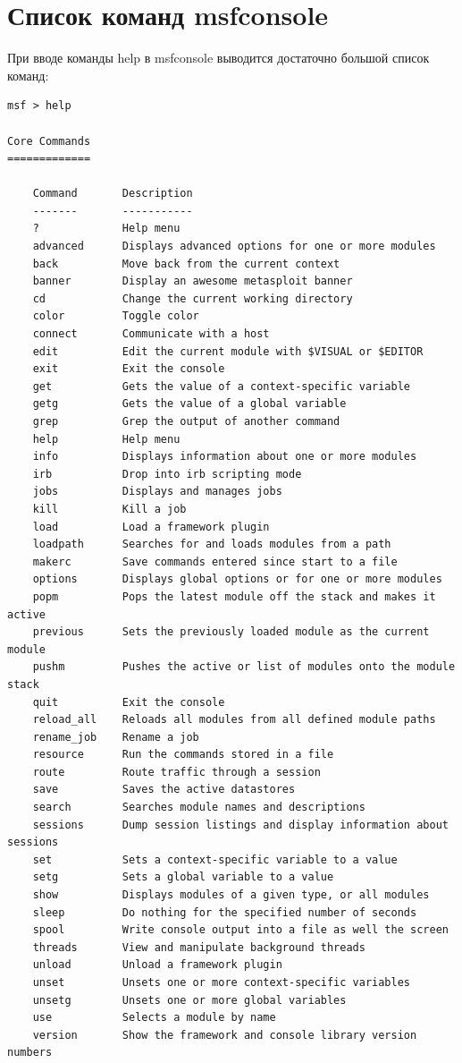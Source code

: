 \documentclass[10pt,a4paper]{report}
\begin{document}
		\section{Список команд msfconsole}
		При вводе команды help в msfconsole выводится достаточно большой список 
		команд:
		\begin{lstlisting}
msf > help

Core Commands
=============

    Command       Description
    -------       -----------
    ?             Help menu
    advanced      Displays advanced options for one or more modules
    back          Move back from the current context
    banner        Display an awesome metasploit banner
    cd            Change the current working directory
    color         Toggle color
    connect       Communicate with a host
    edit          Edit the current module with $VISUAL or $EDITOR
    exit          Exit the console
    get           Gets the value of a context-specific variable
    getg          Gets the value of a global variable
    grep          Grep the output of another command
    help          Help menu
    info          Displays information about one or more modules
    irb           Drop into irb scripting mode
    jobs          Displays and manages jobs
    kill          Kill a job
    load          Load a framework plugin
    loadpath      Searches for and loads modules from a path
    makerc        Save commands entered since start to a file
    options       Displays global options or for one or more modules
    popm          Pops the latest module off the stack and makes it active
    previous      Sets the previously loaded module as the current module
    pushm         Pushes the active or list of modules onto the module stack
    quit          Exit the console
    reload_all    Reloads all modules from all defined module paths
    rename_job    Rename a job
    resource      Run the commands stored in a file
    route         Route traffic through a session
    save          Saves the active datastores
    search        Searches module names and descriptions
    sessions      Dump session listings and display information about sessions
    set           Sets a context-specific variable to a value
    setg          Sets a global variable to a value
    show          Displays modules of a given type, or all modules
    sleep         Do nothing for the specified number of seconds
    spool         Write console output into a file as well the screen
    threads       View and manipulate background threads
    unload        Unload a framework plugin
    unset         Unsets one or more context-specific variables
    unsetg        Unsets one or more global variables
    use           Selects a module by name
    version       Show the framework and console library version numbers



\end{lstlisting}
\end{document}
